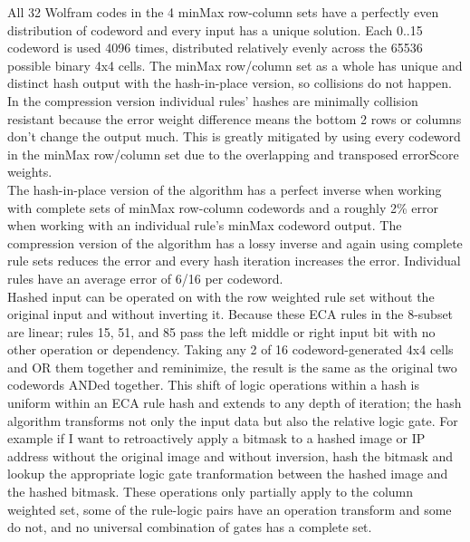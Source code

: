 \documentclass[11pt]{article}
\begin{document}
All 32 Wolfram codes in the 4 minMax row-column sets have a perfectly even distribution of codeword and every input has a unique solution. Each 0..15 codeword is used 4096 times, distributed relatively evenly across the 65536 possible binary 4x4 cells. The minMax row/column set as a whole has unique and distinct hash output with the hash-in-place version, so collisions do not happen. In the compression version individual rules' hashes are minimally collision resistant because the error weight difference means the bottom 2 rows or columns don't change the output much. This is greatly mitigated by using every codeword in the minMax row/column set due to the overlapping and transposed errorScore weights.\\

The hash-in-place version of the algorithm has a perfect inverse when working with complete sets of minMax row-column codewords and a roughly 2\% error when working with an individual rule's minMax codeword output. The compression version of the algorithm has a lossy inverse and again using complete rule sets reduces the error and every hash iteration increases the error. Individual rules have an average error of 6/16 per codeword.\\

Hashed input can be operated on with the row weighted rule set without the original input and without inverting it. Because these ECA rules in the 8-subset are linear; rules 15, 51, and 85 pass the left middle or right input bit with no other operation or dependency. Taking any 2 of 16 codeword-generated 4x4 cells and OR them together and reminimize, the result is the same as the original two codewords ANDed together.  This shift of logic operations within a hash is uniform within an ECA rule hash and extends to any depth of iteration; the hash algorithm transforms not only the input data but also the relative logic gate. For example if I want to retroactively apply a bitmask to a hashed image or IP address without the original image and without inversion, hash the bitmask and lookup the appropriate logic gate tranformation between the hashed image and the hashed bitmask. These operations only partially apply to the column weighted set, some of the rule-logic pairs have an operation transform and some do not, and no universal combination of gates has a complete set. \\
\end{document}
